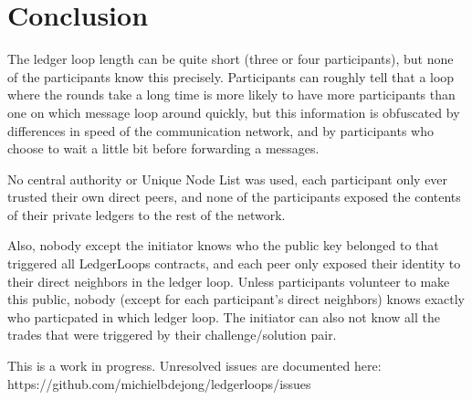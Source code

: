 \documentclass[11pt,twoside,a4paper]{article}
\begin{document}
\section{Conclusion}
The ledger loop length can be quite short (three or four participants), but none of the participants know this precisely. Participants can roughly tell that a loop where the rounds take a long time is more likely to have more participants than one on which message loop around quickly,
but this information is obfuscated by differences in speed of the communication network, and by participants who choose to wait a
little bit before forwarding a messages.

No central authority or Unique Node List was used, each participant only ever trusted their own direct peers, and none of the participants
exposed the contents of their private ledgers to the rest of the network.

Also, nobody except the initiator knows who the public key belonged to that triggered all LedgerLoops contracts, and each peer only exposed
their identity to their direct neighbors in the ledger loop. Unless participants volunteer to make this public,
nobody (except for each participant's direct neighbors) knows exactly who particpated in which ledger loop.
The initiator can also not know all the trades that were triggered by their challenge/solution pair.

This is a work in progress. Unresolved issues are documented here:
https://github.com/michielbdejong/ledgerloops/issues
\end{document}
